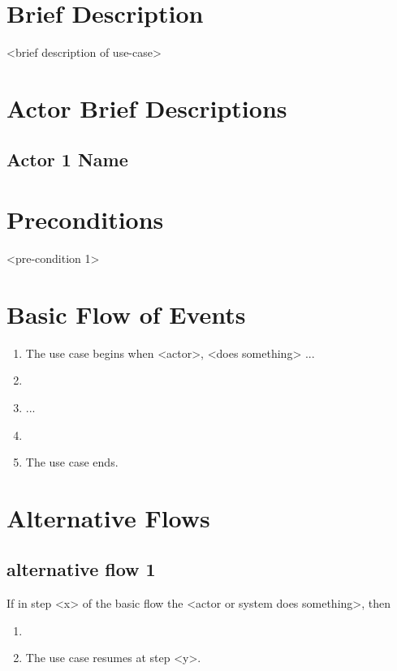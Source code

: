 %
%
%
%


\section{Brief Description}
<brief description of use-case>


\section{Actor Brief Descriptions}
\subsection{Actor 1 Name}


\section{Preconditions}
<pre-condition 1>


\section{Basic Flow of Events}
\begin{enumerate}
  \item The use case begins when <actor>, <does something> ...
  \item <basic flow step 1>
  \item ...
  \item <basic flow step n>
  \item The use case ends.
\end{enumerate}


\section{Alternative Flows}
\subsection{alternative flow 1}
If in step <x> of the basic flow the <actor or system does something>, then
\begin{enumerate}
  \item <describe flow>
  \item The use case resumes at step <y>.
\end{enumerate}


